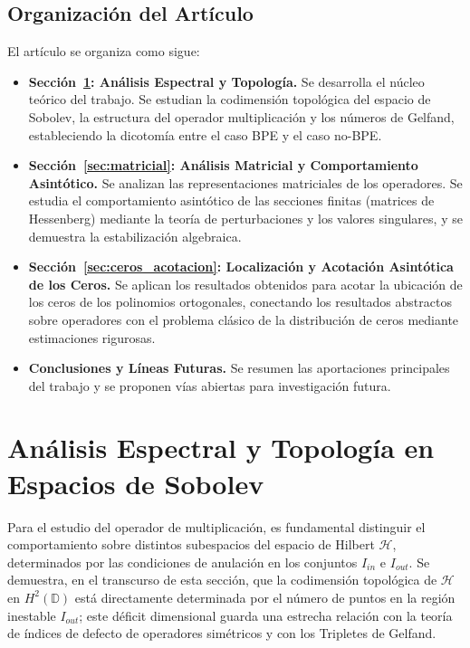 \documentclass[12pt,a4paper]{article}
\theoremstyle{definition}
\theoremstyle{remark}
\begin{document}
\subsection{Organización del Artículo}

El artículo se organiza como sigue:

\begin{itemize}
	\item \textbf{Sección~\ref{sec:espectral}: Análisis Espectral y Topología.} Se desarrolla el núcleo teórico del trabajo. Se estudian la codimensión topológica del espacio de Sobolev, la estructura del operador multiplicación y los números de Gelfand, estableciendo la dicotomía entre el caso BPE y el caso no-BPE.

	\item \textbf{Sección~\ref{sec:matricial}: Análisis Matricial y Comportamiento Asintótico.} Se analizan las representaciones matriciales de los operadores. Se estudia el comportamiento asintótico de las secciones finitas (matrices de Hessenberg) mediante la teoría de perturbaciones y los valores singulares, y se demuestra la estabilización algebraica.

	\item \textbf{Sección~\ref{sec:ceros_acotacion}: Localización y Acotación Asintótica de los Ceros.} Se aplican los resultados obtenidos para acotar la ubicación de los ceros de los polinomios ortogonales, conectando los resultados abstractos sobre operadores con el problema clásico de la distribución de ceros mediante estimaciones rigurosas.

	\item \textbf{Conclusiones y Líneas Futuras.} Se resumen las aportaciones principales del trabajo y se proponen vías abiertas para investigación futura.
\end{itemize}

\section{Análisis Espectral y Topología en Espacios de Sobolev}\label{sec:espectral}

Para el estudio del operador de multiplicación, es fundamental distinguir el comportamiento sobre distintos subespacios del espacio de Hilbert $\mathcal{H}$, determinados por las condiciones de anulación en los conjuntos $I_{in}$ e $I_{out}$. Se demuestra, en el transcurso de esta sección, que la codimensión topológica de $\mathcal{H}$ en $H^2(\mathbb{D})$ está directamente determinada por el número de puntos en la región inestable $I_{out}$; este déficit dimensional guarda una estrecha relación con la teoría de índices de defecto de operadores simétricos y con los Tripletes de Gelfand.
\end{document}
